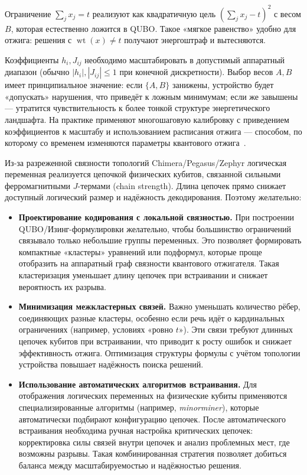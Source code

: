 Ограничение $\sum_j x_j = t$ реализуют как квадратичную цель $(\sum_j x_j - t)^2$ с весом $B$, которая естественно ложится в QUBO. Такое «мягкое равенство» удобно для отжига: решения с $\operatorname{wt}(x) \neq t$ получают энергоштраф и вытесняются.

Коэффициенты $h_i, J_{ij}$ необходимо масштабировать в допустимый аппаратный диапазон (обычно $|h_i|,|J_{ij}| \leq 1$ при конечной дискретности). Выбор весов $A,B$ имеет принципиальное значение: если $\{A,B\}$ занижены, устройство будет «допускать» нарушения, что приведёт к ложным минимумам; если же завышены — утратится чувствительность к более тонкой структуре энергетического ландшафта. На практике применяют многошаговую калибровку с приведением коэффициентов к масштабу и использованием расписания отжига --- способом, по которому со временем изменяются параметры квантового отжига~\cite{DWaveDocs}.


Из-за разреженной связности топологий Chimera/Pegasus/Zephyr логическая переменная реализуется цепочкой физических кубитов, связанной сильными ферромагнитными $J$-термами (chain strength). Длина цепочек прямо снижает доступный логический размер и надёжность декодирования. Поэтому желательно:
\begin{itemize}
  \item \textbf{Проектирование кодирования с локальной связностью.} При построении QUBO/Изинг-формулировки желательно, чтобы большинство ограничений связывало только небольшие группы переменных. Это позволяет формировать компактные «кластеры» уравнений или подформул, которые проще отобразить на аппаратный граф связности квантового отжигателя. Такая кластеризация уменьшает длину цепочек при встраивании и снижает вероятность их разрыва.
  
  \item \textbf{Минимизация межкластерных связей.} Важно уменьшать количество рёбер, соединяющих разные кластеры, особенно если речь идёт о кардинальных ограничениях (например, условиях «ровно $t$»). Эти связи требуют длинных цепочек кубитов при встраивании, что приводит к росту ошибок и снижает эффективность отжига. Оптимизация структуры формулы с учётом топологии устройства повышает надёжность поиска решений.
  
  \item \textbf{Использование автоматических алгоритмов встраивания.} Для отображения логических переменных на физические кубиты применяются специализированные алгоритмы (например, \textit{minorminer}), которые автоматически подбирают конфигурацию цепочек. После автоматического встраивания необходима ручная настройка критических цепочек: корректировка силы связей внутри цепочек и анализ проблемных мест, где возможны разрывы. Такая комбинированная стратегия позволяет добиться баланса между масштабируемостью и надёжностью решения.
\end{itemize}

